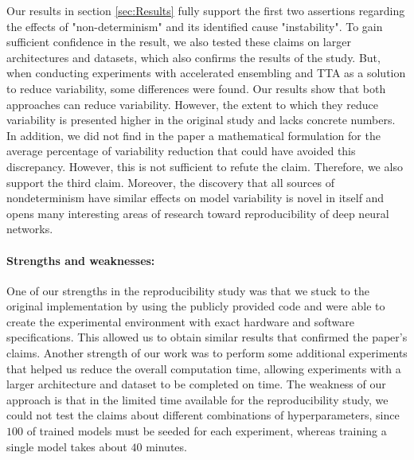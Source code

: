 Our results in section \ref{sec:Results} fully support the first two assertions regarding the effects of "non-determinism" and its identified cause "instability". To gain sufficient confidence in the result, we also tested these claims on larger architectures and datasets, which also confirms the results of the study. But, when conducting experiments with accelerated ensembling and TTA as a solution to reduce variability, some differences were found. Our results show that both approaches can reduce variability. However, the extent to which they reduce variability is presented higher in the original study and lacks concrete numbers. In addition, we did not find in the paper a mathematical formulation for the average percentage of variability reduction that could have avoided this discrepancy. However, this is not sufficient to refute the claim. Therefore, we also support the third claim. Moreover, the discovery that all sources of nondeterminism have similar effects on model variability is novel in itself and opens many interesting areas of research toward reproducibility of deep neural networks.

\paragraph{Strengths and weaknesses:}
One of our strengths in the reproducibility study was that we stuck to the original implementation by using the publicly provided code and were able to create the experimental environment with exact hardware and software specifications. This allowed us to obtain similar results that confirmed the paper's claims. Another strength of our work was to perform some additional experiments that helped us reduce the overall computation time, allowing experiments with a larger architecture and dataset to be completed on time. The weakness of our approach is that in the limited time available for the reproducibility study, we could not test the claims about different combinations of hyperparameters, since $100$ of trained models must be seeded for each experiment, whereas training a single model takes about $40$ minutes.

